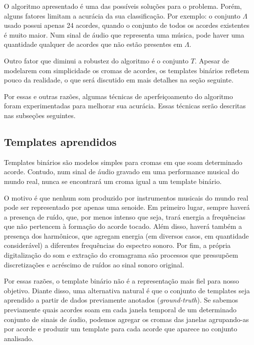     O algoritmo apresentado é uma das possíveis soluções para o problema. Porém, alguns fatores limitam a acurácia da sua classificação. Por exemplo: o conjunto $\Lambda$ usado possui apenas 24 acordes, quando o conjunto de todos os acordes existentes é muito maior. Num sinal de áudio que representa uma música, pode haver uma quantidade qualquer de acordes que não estão presentes em $\Lambda$.

    Outro fator que diminui a robustez do algoritmo é o conjunto $T$. Apesar de modelarem com simplicidade os cromas de acordes, os templates binários refletem pouco da realidade, o que será discutido em mais detalhes na seção seguinte.

    Por essas e outras razões, algumas técnicas de aperfeiçoamento do algoritmo foram experimentadas para melhorar sua acurácia. Essas técnicas serão descritas nas subseções seguintes.


    \subsection{Templates aprendidos}
        Templates binários são modelos simples para cromas em que soam determinado acorde. Contudo, num sinal de áudio gravado em uma performance musical do mundo real, nunca se encontrará um croma igual a um template binário.

        O motivo é que nenhum som produzido por instrumentos musicais do mundo real pode ser representado por apenas uma senoide. Em primeiro lugar, sempre haverá a presença de ruído, que, por menos intenso que seja, trará energia a frequências que não pertencem à formação do acorde tocado. Além disso, haverá também a presença dos harmônicos, que agregam energia (em diversos casos, em quantidade considerável) a diferentes frequências do espectro sonoro. Por fim, a própria digitalização do som e extração do cromagrama são processos que pressupõem discretizações e acréscimo de ruídos ao sinal sonoro original.

        Por essas razões, o template binário não é a representação mais fiel para nosso objetivo. Diante disso, uma alternativa natural é que o conjunto de templates seja aprendido a partir de dados previamente anotados (\textit{ground-truth}). Se sabemos previamente quais acordes soam em cada janela temporal de um determinado conjunto de sinais de áudio, podemos agregar os cromas das janelas agrupando-as por acorde e produzir um template para cada acorde que aparece no conjunto analisado.

